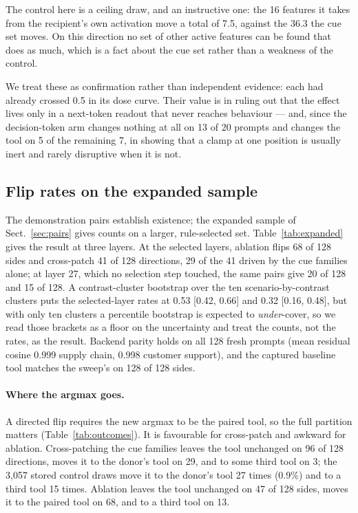 \documentclass{article}
\begin{document}
\noindent The control here is a ceiling draw, and an instructive one: the 16 features it takes from the recipient's own activation move a total of 7.5, against the 36.3 the cue set moves. On this direction no set of other active features can be found that does as much, which is a fact about the cue set rather than a weakness of the control.

We treat these as confirmation rather than independent evidence: each had already crossed 0.5 in its dose curve. Their value is in ruling out that the effect lives only in a next-token readout that never reaches behaviour --- and, since the decision-token arm changes nothing at all on 13 of 20 prompts and changes the tool on 5 of the remaining 7, in showing that a clamp at one position is usually inert and rarely disruptive when it is not.

\subsection{Flip rates on the expanded sample}
\label{sec:expanded}

The demonstration pairs establish existence; the expanded sample of Sect.~\ref{sec:pairs} gives counts on a larger, rule-selected set. Table~\ref{tab:expanded} gives the result at three layers. At the selected layers, ablation flips 68 of 128 sides and cross-patch 41 of 128 directions, 29 of the 41 driven by the cue families alone; at layer 27, which no selection step touched, the same pairs give 20 of 128 and 15 of 128. A contrast-cluster bootstrap over the ten scenario-by-contrast clusters puts the selected-layer rates at 0.53 [0.42, 0.66] and 0.32 [0.16, 0.48], but with only ten clusters a percentile bootstrap is expected to \emph{under}-cover, so we read those brackets as a floor on the uncertainty and treat the counts, not the rates, as the result. Backend parity holds on all 128 fresh prompts (mean residual cosine 0.999 supply chain, 0.998 customer support), and the captured baseline tool matches the sweep's on 128 of 128 sides.

\paragraph{Where the argmax goes.} A directed flip requires the new argmax to be the paired tool, so the full partition matters (Table~\ref{tab:outcomes}). It is favourable for cross-patch and awkward for ablation. Cross-patching the cue families leaves the tool unchanged on 96 of 128 directions, moves it to the donor's tool on 29, and to some third tool on 3; the 3{,}057 stored control draws move it to the donor's tool 27 times (0.9\%) and to a third tool 15 times. Ablation leaves the tool unchanged on 47 of 128 sides, moves it to the paired tool on 68, and to a third tool on 13.
\end{document}
